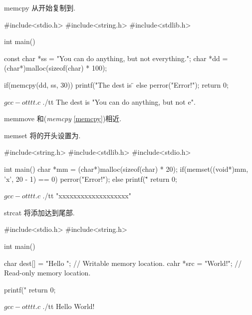 \begin{cfunc}{memcpy}
从开始复制\bytes 到.
\begin{usage}
\begin{sccode}
#include<stdio.h>
#include<string.h>
#include<stdlib.h>

int main()
{
    const char *ss = "You can do anything, but not everything.";
    char *dd = (char*)malloc(sizeof(char) * 100);

    if(memcpy(dd, ss, 30)){
        printf("The dest is \"%
    } else {
        perror("Error!\n");
    }
    return 0;
}
\end{sccode}
\comout
\begin{sbcode}
$ gcc -o tt tt.c
$ ./tt
The dest is "You can do anything, but not e".
\end{sbcode}
\end{usage}
\end{cfunc}

\begin{cfunc}{memmove}
和({\em memcpy} \ref{memcpy})相近.
\end{cfunc}

\begin{cfunc}{memset}
将的开头\bytes 设置为.
\begin{usage}
\begin{sccode}
#include<string.h>
#include<stdlib.h>
#include<stdio.h>

int main()
{
    char *mm = (char*)malloc(sizeof(char) * 20);
    if(memset((void*)mm, 'x', 20 - 1) == 0){
        perror("Error!");
    } else {
        printf("\"%
    }
    return 0;
}
\end{sccode}
\comout
\begin{sbcode}
$ gcc -o tt tt.c
$ ./tt
"xxxxxxxxxxxxxxxxxxx"
\end{sbcode}
\end{usage}
\end{cfunc}

\begin{cfunc}{strcat}
将添加达到尾部.
\begin{usage}
\begin{sccode}
#include<stdio.h>
#include<string.h>

int main()
{
    char dest[] = "Hello "; // Writable memory location.
    cahr *src = "World!\n"; // Read-only memory location.

    printf("%
    return 0;
}
\end{sccode}
\comout
\begin{sbcode}
$ gcc -o tt tt.c
$ ./tt
Hello World!
\end{sbcode}
\end{usage}
\end{cfunc}

